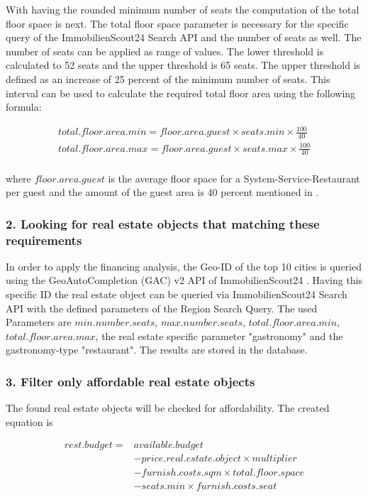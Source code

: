 With having the rounded minimum number of seats the computation of the total floor space is next. The total
 floor space parameter is necessary for the specific query of the ImmobilienScout24 Search API \cite{ImmoScout} and
 the number of seats as well. The number of seats can be applied as range of values. The lower threshold is calculated to 52 seats and
 the upper threshold is 65 seats. The upper threshold is defined as an increase of 25 percent of the minimum number of seats.
 This interval can be used to calculate the required total floor area using the following formula:

\begin{equation}
    \begin{aligned}
        total.floor.area.min = floor.area.guest \times seats.min \times \frac{100}{40} \\
        total.floor.area.max = floor.area.guest \times seats.max \times \frac{100}{40} \\
    \end{aligned}
    \label{eq:total_floor_space}
\end{equation}

where $floor.area.guest$ is the average floor space for a System-Service-Restaurant per guest \cite{FlaecheGast} and the
 amount of the guest area is 40 percent mentioned in \cite{FlaecheGastronomie}.

\subsubsection{2. Looking for real estate objects that matching these requirements}
In order to apply the financing analysis, the Geo-ID of the top 10 cities is queried using the GeoAutoCompletion (GAC)
 v2 \ac{API} of ImmobilienScout24 \cite{ImmoScout}. Having this specific ID the real estate object can be queried via ImmobilienScout24 Search \ac{API}
 with the defined parameters of the Region Search Query. The used Parameters are $min.number.seats$,
 $max.number.seats$, $total.floor.area.min$, $total.floor.area.max$, the real estate specific parameter
 "gastronomy" and the gastronomy-type "restaurant". The results are stored in the \pg{} database.

\subsubsection{3. Filter only affordable real estate objects}
The found real estate objects will be checked for affordability. The created equation is
\begin{center}
    \begin{equation}
        \begin{aligned}
        rest.budget = & available.budget \\
            &- price.real.estate.object \times multiplier \\
            &- furnish.costs.sqm \times total.floor.space \\
            &- seats.min \times furnish.costs.seat
        \end{aligned}
        \label{eq:affordable}
    \end{equation}
\end{center}

